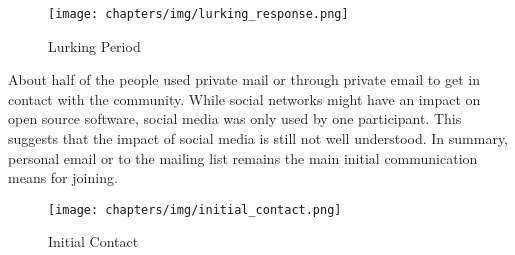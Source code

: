 \begin{figure}[ht!]
\centering
\texttt{[image: chapters/img/lurking\_response.png]}
\caption{Lurking Period}
\label{fig:lurking_period}
\end{figure}

\noindent About half of the people used private mail or through private email to get in contact with the community. While social networks might have an impact on open source software, social media was only used by one participant. This suggests that the impact of social media is still not well understood. In summary, personal email or to the mailing list remains the main initial communication means for joining.

\begin{figure}[ht!]
\centering
\texttt{[image: chapters/img/initial\_contact.png]}
\caption{Initial Contact}
\label{fig:initial_contact}
\end{figure}
